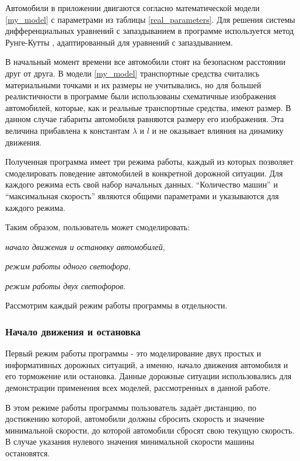 \documentclass[12pt, a4paper]{extarticle}
\renewenvironment{itemize}[1][{---\hfil}]{\begin{list}{#1}{\topsep=0pt\parsep=0pt plus 1pt\itemsep=\parsep\leftmargin=0pt \itemindent=\parindent}\addtolength{\itemindent}{\labelwidth}}{\end{list}}
\numberwithin{equation}{section}
\numberwithin{figure}{section}
\begin{document}
Автомобили в приложении двигаются согласно математической модели \eqref{my_model} с параметрами из таблицы \ref{real_parameters}. Для решения системы дифференциальных уравнений с запаздыванием в программе используется метод Рунге-Кутты \cite{Runge_Kutta}, адаптированный для уравнений с запаздыванием.

В начальный момент времени все автомобили стоят на безопасном расстоянии друг от друга. В модели \eqref{my_model} транспортные средства считались материальными точками и их размеры не учитывались, но для большей реалистичности в программе были использованы схематичные изображения автомобилей, которые, как и реальные транспортные средства, имеют размер. В данном случае габариты автомобиля равняются размеру его изображения. Эта величина прибавлена к константам $\lambda$ и $l$ и не оказывает влияния на динамику движения.

Полученная программа имеет три режима работы, каждый из которых позволяет смоделировать поведение автомобилей в конкретной дорожной ситуации. Для каждого режима есть свой набор начальных данных. ``Количество машин'' и ``максимальная скорость'' являются общими параметрами и указываются для каждого режима.

\noindent Таким образом, пользователь может смоделировать:

\begin{itemize} 
	\item \textit{начало движения и остановку автомобилей},
	\item \textit{режим работы одного светофора},
	\item \textit{режим работы двух светофоров}.
\end{itemize}

\noindent Рассмотрим каждый режим работы программы в отдельности.

\subsubsection{Начало движения и остановка}

Первый режим работы программы - это моделирование двух простых и информативных дорожных ситуаций, а именно, начало движения автомобиля и его торможение или остановка. Данные дорожные ситуации использовались для демонстрации применения всех моделей, рассмотренных в данной работе.

В этом режиме работы программы пользователь задаёт дистанцию, по достижению которой, автомобили должны сбросить скорость и значение минимальной скорости, до которой автомобили сбросят свою текущую скорость. В случае указания нулевого значения минимальной скорости машины остановятся.
\end{document}
